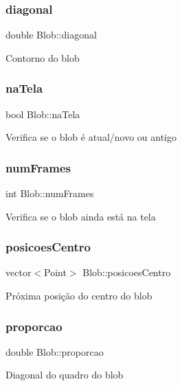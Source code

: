 \subsubsection{\texorpdfstring{diagonal}{diagonal}}
{\footnotesize\ttfamily double Blob\+::diagonal}

Contorno do blob \mbox{\label{class_blob_a57b76134e44f731fdb2afcf85de066c4}} 
\subsubsection{\texorpdfstring{na\+Tela}{naTela}}
{\footnotesize\ttfamily bool Blob\+::na\+Tela}

Verifica se o blob é atual/novo ou antigo \mbox{\label{class_blob_a3c6b8107db4ef7269ad117f1120a69e3}} 
\subsubsection{\texorpdfstring{num\+Frames}{numFrames}}
{\footnotesize\ttfamily int Blob\+::num\+Frames}

Verifica se o blob ainda está na tela \mbox{\label{class_blob_a07f56ca5b367f2a9b15622d92e2c671a}} 
\subsubsection{\texorpdfstring{posicoes\+Centro}{posicoesCentro}}
{\footnotesize\ttfamily vector$<$Point$>$ Blob\+::posicoes\+Centro}

Próxima posição do centro do blob \mbox{\label{class_blob_a0e1f64cf95a07d948728f9e00d1feec1}} 
\subsubsection{\texorpdfstring{proporcao}{proporcao}}
{\footnotesize\ttfamily double Blob\+::proporcao}

Diagonal do quadro do blob \mbox{\label{class_blob_ad4eeb7d2aa4ef4f6c6e038737ce41043}} 
